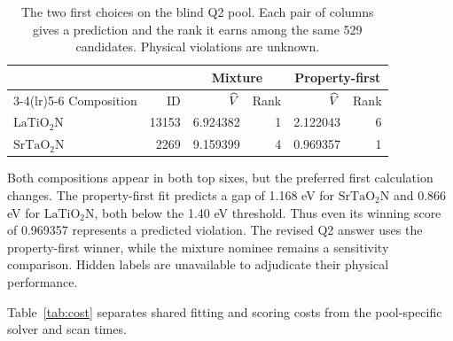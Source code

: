 \begin{table}[htbp]
\caption{The two first choices on the blind Q2 pool. Each pair of columns gives a prediction and the rank it earns among the same 529 candidates. Physical violations are unknown.}\label{tab:crossrank}
\centering\small\begin{tabular}{lrrrrr}
\toprule & & \multicolumn{2}{c}{Mixture} & \multicolumn{2}{c}{Property-first}\\
\cmidrule(lr){3-4}\cmidrule(lr){5-6}
Composition & ID & $\widehat V$ & Rank & $\widehat V$ & Rank\\\midrule
$\mathrm{LaTiO_2N}$ & 13153 & 6.924382 & 1 & 2.122043 & 6\\
$\mathrm{SrTaO_2N}$ & 2269 & 9.159399 & 4 & 0.969357 & 1\\\bottomrule
\end{tabular}
\end{table}
Both compositions appear in both top sixes, but the preferred first calculation changes. The property-first fit predicts a gap of 1.168 eV for $\mathrm{SrTaO_2N}$ and 0.866 eV for $\mathrm{LaTiO_2N}$, both below the 1.40 eV threshold. Thus even its winning score of 0.969357 represents a predicted violation. The revised Q2 answer uses the property-first winner, while the mixture nominee remains a sensitivity comparison. Hidden labels are unavailable to adjudicate their physical performance.



Table~\ref{tab:cost} separates shared fitting and scoring costs from the pool-specific solver and scan times.

